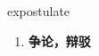 
\begin{frame}
{\huge expostulate}
\begin{center}
\begin{enumerate}\Large
  \item \textbf{争论，辩驳}
\end{enumerate}
\end{center}
\end{frame}
